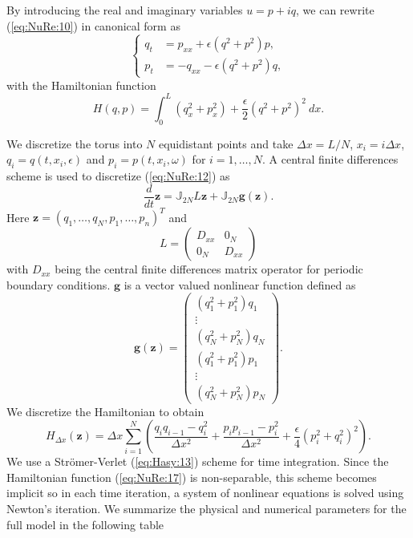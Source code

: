 By introducing the real and imaginary variables $u = p + iq$, we can rewrite (\ref{eq:NuRe:10}) in canonical form as
\begin{equation} \label{eq:NuRe:12}
\left\{
\begin{aligned}
 q_t &= p_{xx} + \epsilon (q^2+p^2)p, \\
 p_t &= -q_{xx} - \epsilon (q^2 + p^2)q,
\end{aligned}
\right.
\end{equation}
with the Hamiltonian function
\begin{equation} \label{eq:NuRe:13}
	H(q,p) = \int_{0}^{L} (q_x^2 + p_x^2) + \frac \epsilon 2 (q^2 + p^2)^2\ dx.
\end{equation}

We discretize the torus into $N$ equidistant points and take $\Delta x = L/N$, $x_i = i\Delta x$, $q_i=q(t,x_i,\epsilon)$ and $p_i = p(t,x_i,\omega)$ for $i = 1 ,\dots,N$. A central finite differences scheme is used to discretize (\ref{eq:NuRe:12}) as
\begin{equation}  \label{eq:NuRe:14}
	\frac{d}{dt} \mathbf z = \mathbb J_{2N} L\mathbf z + \mathbb J_{2N} \mathbf g(\mathbf z).
\end{equation}
Here $\mathbf z = (q_1,\dots,q_N,p_1,\dots,p_n)^T$ and
\begin{equation}  \label{eq:NuRe:15}
	L = 
	\begin{pmatrix}
		D_{xx} & 0_N \\
		0_N & D_{xx}
	\end{pmatrix}
\end{equation}
with $D_{xx}$ being the central finite differences matrix operator for periodic boundary conditions. $\mathbf g$ is a vector valued nonlinear function defined as
\begin{equation}  \label{eq:NuRe:16}
	\mathbf g(\mathbf z) =
	\begin{pmatrix}
	(q_1^2 + p_1^2)q_1 \\
	\vdots \\
	(q_N^2 + p_N^2)q_N \\
	(q_1^2 + p_1^2)p_1 \\
	\vdots \\
	(q_N^2 + p_N^2)p_N
	\end{pmatrix}.
\end{equation}
We discretize the Hamiltonian to obtain
\begin{equation}  \label{eq:NuRe:17}
	H_{\Delta x}(\mathbf z) = {\Delta x}\sum_{i=1}^{N} \left( \frac{q_i q_{i-1} - q_i^2}{\Delta x ^2} + \frac{p_i p_{i-1} - p_i^2}{\Delta x ^2} + \frac \epsilon 4 (p_i^2 + q_i^2)^2  \right).
\end{equation}
We use a Str\"omer-Verlet (\ref{eq:Hasy:13}) scheme for time integration. Since the Hamiltonian function (\ref{eq:NuRe:17}) is non-separable, this scheme becomes implicit so in each time iteration, a system of nonlinear equations is solved using Newton's iteration. We summarize the physical and numerical parameters for the full model in the following table

